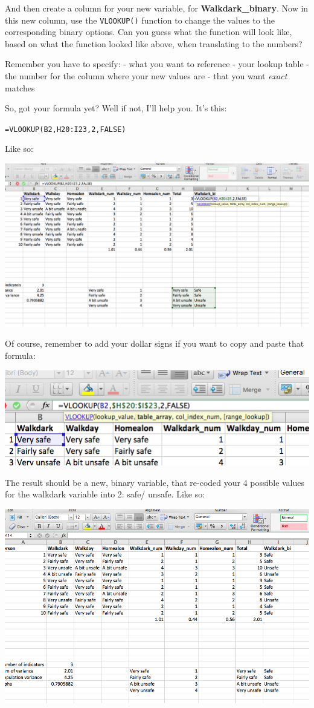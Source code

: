 \documentclass[
]{book}
\begin{document}
And then create a column for your new variable, for \textbf{Walkdark\_binary}. Now in this new column, use the \texttt{VLOOKUP()} function to change the values to the corresponding binary options. Can you guess what the function will look like, based on what the function looked like above, when translating to the numbers?

Remember you have to specify:
- what you want to reference
- your lookup table
- the number for the column where your new values are
- that you want \emph{exact} matches

So, got your formula yet? Well if not, I'll help you. It's this:

\texttt{=VLOOKUP(B2,H20:I23,2,FALSE)}

Like so:

\includegraphics{imgs/binary_vlookup.png}

Of course, remember to add your dollar signs if you want to copy and paste that formula:

\includegraphics{imgs/add_dolla_lookup.png}

The result should be a new, binary variable, that re-coded your 4 possible values for the walkdark variable into 2: safe/ unsafe. Like so:

\includegraphics{imgs/final_binary_recode.png}
\end{document}
